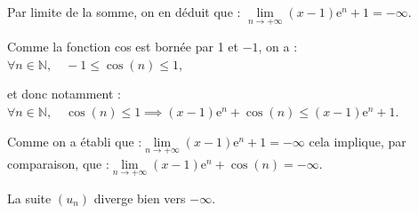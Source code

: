 \documentclass[10pt]{article}
\providecommand{\N}{\mathbb{N}}
\providecommand{\e}{{\mathrm{e}}}
\begin{document}
\begin{enumerate}
Par limite de la somme, on en déduit que : \quad $\lim\limits_{n \to +\infty} (x-1) \e^{n} + 1 = -\infty$.

Comme la fonction cos est bornée par 1 et $-1$, on a : \quad $\forall n \in \N,\quad -1 \leqslant \cos(n) \leqslant 1$,

et donc notamment :\quad $\forall n \in \N,\quad \cos(n) \leqslant 1 \implies (x-1) \e^{n} + \cos(n) \leqslant (x-1) \e^{n} + 1$.

Comme on a établi que :\quad $\lim\limits_{n \to +\infty} (x-1) \e^{n} + 1 = -\infty$ \quad cela implique, par comparaison, que :\quad $\lim\limits_{n \to +\infty} (x-1) \e^{n} + \cos(n) = -\infty$.

La suite $(u_n)$ diverge bien vers $-\infty$.
\end{enumerate}
\end{document}
